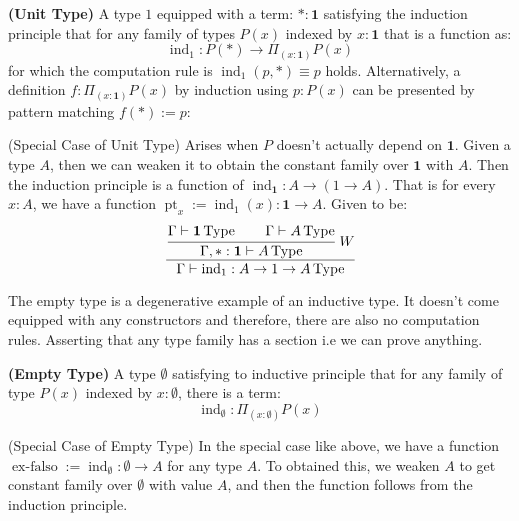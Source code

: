\begin{definition}{\textbf{(Unit Type)}}
    A type $1$ equipped with a term: $*:\boldsymbol{1}$ satisfying the induction principle that for any family of types $P(x)$ indexed by $x:\boldsymbol{1}$ that is a function as: 
    \begin{equation*}
        \operatorname{ind}_1:P(*)\rightarrow\Pi_{(x:\boldsymbol{1})}P(x)
    \end{equation*}
    for which the computation rule is $\operatorname{ind} _1(p,*)\equiv p$ holds. Alternatively, a definition $f:\Pi_{(x:\boldsymbol{1})}P(x)$ by induction using $p:P(x)$ can be presented by pattern matching $f(*):=p$:
\end{definition}

\begin{remark}{(Special Case of Unit Type)}
    Arises when $P$ doesn't actually depend on $\boldsymbol{1}$. Given a type $A$, then we can weaken it to obtain the constant family over $\boldsymbol{1}$ with $A$. Then the induction principle is a function of $\operatorname{ind}_{\boldsymbol{1}}:A\rightarrow(1\rightarrow A)$. That is for every $x:A$, we have a function $\operatorname{pt}_x:=\operatorname{ind}_1(x):\boldsymbol{1}\rightarrow A$. Given to be:
    \begin{equation*}
        \cfrac{\cfrac{\Gamma\vdash \boldsymbol{1}\operatorname{Type}\qquad\Gamma\vdash A\operatorname{Type}}{\Gamma, *:\boldsymbol{1}\vdash A\operatorname{Type}}\ W}{\Gamma\vdash \operatorname{ind}_1: A\to1\to A\operatorname{Type}}
    \end{equation*}
\end{remark}

The empty type is a degenerative example of an inductive type. It doesn't come equipped with any constructors and therefore, there are also no computation rules. Asserting that any type family has a section i.e we can prove anything.

\begin{definition}{\textbf{(Empty Type)}}
    A type $\emptyset$ satisfying to inductive principle that for any family of type $P(x)$ indexed by $x:\emptyset$, there is a term:
    \begin{equation*}
        \operatorname{ind}_\emptyset:\Pi_{(x:\emptyset)}P(x)
    \end{equation*}
\end{definition}

\begin{remark}{(Special Case of Empty Type)}
    In the special case like above, we have a function $\operatorname{ex-falso}:=\operatorname{ind}_\emptyset:\emptyset\rightarrow A$ for any type $A$. To obtained this, we weaken $A$ to get constant family over $\emptyset$ with value $A$, and then the function follows from the induction principle.
\end{remark}

